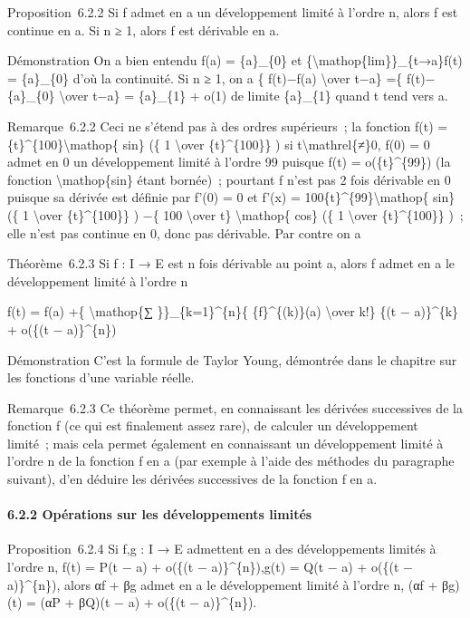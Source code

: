 \documentclass[]{article}
\begin{document}
Proposition~6.2.2 Si f admet en a un développement limité à l'ordre n,
alors f est continue en a. Si n ≥ 1, alors f est dérivable en a.

Démonstration On a bien entendu f(a) = \{a\}\_\{0\} et
\{\textbackslash{}mathop\{lim\}\}\_\{t→a\}f(t) = \{a\}\_\{0\} d'où la
continuité. Si n ≥ 1, on a \{ f(t)−f(a) \textbackslash{}over t−a\} =\{
f(t)−\{a\}\_\{0\} \textbackslash{}over t−a\} = \{a\}\_\{1\} + o(1) de
limite \{a\}\_\{1\} quand t tend vers a.

Remarque~6.2.2 Ceci ne s'étend pas à des ordres supérieurs~; la fonction
f(t) = \{t\}\^{}\{100\}\textbackslash{}mathop\{ sin\} (\{ 1
\textbackslash{}over \{t\}\^{}\{100\}\} ) si
t\textbackslash{}mathrel\{≠\}0, f(0) = 0 admet en 0 un développement
limité à l'ordre 99 puisque f(t) = o(\{t\}\^{}\{99\}) (la fonction
\textbackslash{}mathop\{sin\} étant bornée)~; pourtant f n'est pas 2
fois dérivable en 0 puisque sa dérivée est définie par f'(0) = 0 et
f'(x) = 100\{t\}\^{}\{99\}\textbackslash{}mathop\{ sin\} (\{ 1
\textbackslash{}over \{t\}\^{}\{100\}\} ) −\{ 100 \textbackslash{}over
t\} \textbackslash{}mathop\{ cos\} (\{ 1 \textbackslash{}over
\{t\}\^{}\{100\}\} )~; elle n'est pas continue en 0, donc pas dérivable.
Par contre on a

Théorème~6.2.3 Si f : I → E est n fois dérivable au point a, alors f
admet en a le développement limité à l'ordre n

f(t) = f(a) +\{ \textbackslash{}mathop\{∑ \}\}\_\{k=1\}\^{}\{n\}\{
\{f\}\^{}\{(k)\}(a) \textbackslash{}over k!\} \{(t − a)\}\^{}\{k\} +
o(\{(t − a)\}\^{}\{n\})

Démonstration C'est la formule de Taylor Young, démontrée dans le
chapitre sur les fonctions d'une variable réelle.

Remarque~6.2.3 Ce théorème permet, en connaissant les dérivées
successives de la fonction f (ce qui est finalement assez rare), de
calculer un développement limité~; mais cela permet également en
connaissant un développement limité à l'ordre n de la fonction f en a
(par exemple à l'aide des méthodes du paragraphe suivant), d'en déduire
les dérivées successives de la fonction f en a.

\paragraph{6.2.2 Opérations sur les développements limités}

Proposition~6.2.4 Si f,g : I → E admettent en a des développements
limités à l'ordre n, f(t) = P(t − a) + o(\{(t − a)\}\^{}\{n\}),g(t) =
Q(t − a) + o(\{(t − a)\}\^{}\{n\}), alors αf + βg admet en a le
développement limité à l'ordre n, (αf + βg)(t) = (αP + βQ)(t − a) +
o(\{(t − a)\}\^{}\{n\}).
\end{document}
